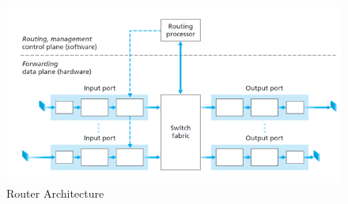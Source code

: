 \documentclass[a4paper]{article}
\theoremstyle{plain}
\theoremstyle{definition}
\begin{document}
\begin{figure}[!h]
    \centering
    \includegraphics[scale=0.8]{cn1.png}
    \caption{Router Architecture}
    \label{fig:my_label_1}
\end{figure}
\end{document}
